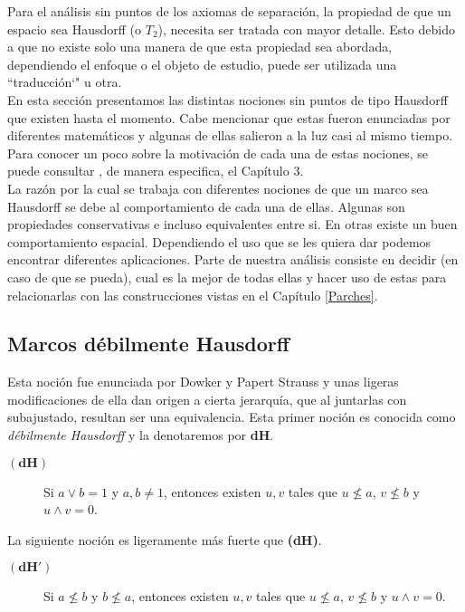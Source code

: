 Para el análisis sin puntos de los axiomas de separación, la propiedad de que un espacio sea Hausdorff (o $T_2$), necesita ser tratada con mayor detalle. Esto debido a que no existe solo una manera de que esta propiedad sea abordada, dependiendo el enfoque o el objeto de estudio, puede ser utilizada una ``traducción`" u otra.\\

En esta sección presentamos las distintas nociones sin puntos de tipo Hausdorff que existen hasta el momento. Cabe mencionar que estas fueron enunciadas por diferentes matemáticos y algunas de ellas salieron a la luz casi al mismo tiempo. Para conocer un poco sobre la motivación de cada una de estas nociones, se puede consultar \cite{J.P.2}, de manera especifica, el Capítulo 3.\\

La razón por la cual se trabaja con diferentes nociones de que un marco sea Hausdorff se debe al comportamiento de cada una de ellas. Algunas son propiedades conservativas e incluso equivalentes entre si. En otras existe un buen comportamiento espacial. Dependiendo el uso que se les quiera dar podemos encontrar diferentes aplicaciones. Parte de nuestra análisis consiste en decidir (en caso de que se pueda), cual es la mejor de todas ellas y hacer uso de estas para relacionarlas con las construcciones vistas en el Capítulo \ref{Parches}.

\subsection{Marcos débilmente Hausdorff}

Esta noción fue enunciada por Dowker y Papert Strauss y unas ligeras modificaciones de ella dan origen a cierta jerarquía, que al juntarlas con subajustado, resultan ser una equivalencia. Esta primer noción es conocida como \emph{débilmente Hausdorff} y la denotaremos por \textbf{dH}.\\

\begin{description}
    \item[$\mathbf{(dH)}$] Si $a\vee b=1$ y $a, b\neq 1$, entonces existen $u, v$ tales que $u\nleq a$, $v\nleq b$ y $u\wedge v=0$. 
\end{description}

La siguiente noción es ligeramente más fuerte que \textbf{(dH)}.

\begin{description}
    \item[$\mathbf{(dH')}$] Si $a\nleq b$ y $b\nleq a$, entonces existen $u, v$ tales que $u\nleq a$, $v\nleq b$ y $u\wedge v=0$. 
\end{description}

